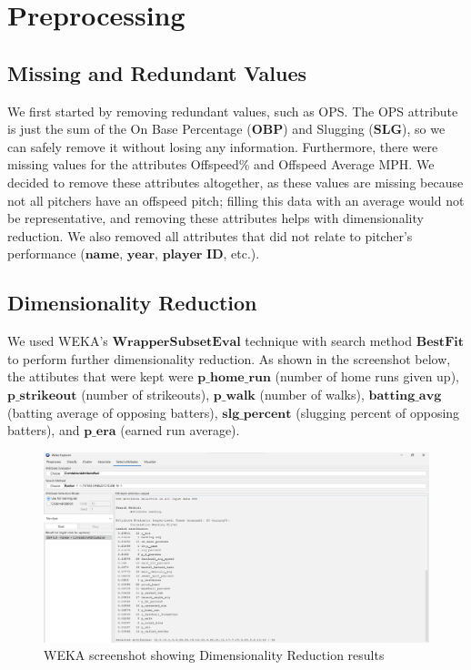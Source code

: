 \documentclass[12pt]{article}
\begin{document}
\section{Preprocessing}
\subsection{Missing and Redundant Values}
We first started by removing redundant values, such as OPS. The OPS attribute is just the sum of the On Base Percentage ($\textbf{OBP}$) and Slugging ($\textbf{SLG}$), so we can safely remove it without losing any information. Furthermore, there were missing values for the attributes Offspeed\% and Offspeed Average MPH. We decided to remove these attributes altogether, as these values are missing because not all pitchers have an offspeed pitch; filling this data with an average would not be representative, and removing these attributes helps with dimensionality reduction. We also removed all attributes that did not relate to pitcher's performance ($\textbf{name}$, $\textbf{year}$, $\textbf{player}$ $\textbf{ID}$, etc.). 
\newpage{}
\subsection{Dimensionality Reduction}
We used WEKA's $\textbf{WrapperSubsetEval}$ technique with search method $\textbf{BestFit}$ to perform further dimensionality reduction. As shown in the screenshot below, the attibutes that were kept were $\textbf{p\_home\_run}$ (number of home runs given up), $\textbf{p\_strikeout}$ (number of strikeouts), $\textbf{p\_walk}$ (number of walks), $\textbf{batting\_avg}$ (batting average of opposing batters), $\textbf{slg\_percent}$ (slugging percent of opposing batters), and $\textbf{p\_era}$ (earned run average). 

\begin{figure}[h!]
    \includegraphics[scale=0.55]{CorrelationAttributeEval.png}
    \caption{WEKA screenshot showing Dimensionality Reduction results}
    \label{fig:CorrelationAttributeEval}
\end{figure}
\end{document}
